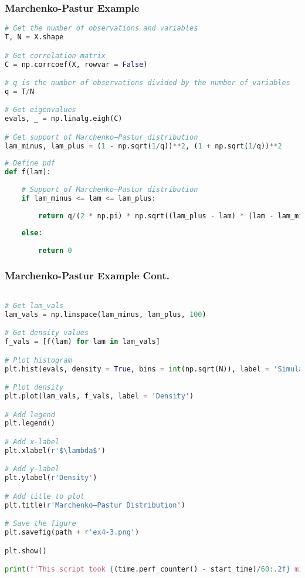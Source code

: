 \documentclass{beamer}
\begin{document}
\begin{frame}[fragile]
\frametitle{Marchenko-Pastur Example}

\begin{lstlisting}[language=Python]
# Get the number of observations and variables
T, N = X.shape

# Get correlation matrix
C = np.corrcoef(X, rowvar = False)

# q is the number of observations divided by the number of variables
q = T/N

# Get eigenvalues
evals, _ = np.linalg.eigh(C)

# Get support of Marchenko–Pastur distribution
lam_minus, lam_plus = (1 - np.sqrt(1/q))**2, (1 + np.sqrt(1/q))**2 
        
# Define pdf
def f(lam):
    
    # Support of Marchenko–Pastur distribution
    if lam_minus <= lam <= lam_plus:
    
        return q/(2 * np.pi) * np.sqrt((lam_plus - lam) * (lam - lam_minus))/lam
                
    else:
        
        return 0

\end{lstlisting}
\end{frame}



\begin{frame}[fragile]
\frametitle{Marchenko-Pastur Example Cont.}

\begin{lstlisting}[language=Python]

# Get lam_vals
lam_vals = np.linspace(lam_minus, lam_plus, 100)

# Get density values
f_vals = [f(lam) for lam in lam_vals]

# Plot histogram
plt.hist(evals, density = True, bins = int(np.sqrt(N)), label = 'Simulated Distribution')

# Plot density
plt.plot(lam_vals, f_vals, label = 'Density')

# Add legend
plt.legend()

# Add x-label
plt.xlabel(r'$\lambda$')

# Add y-label
plt.ylabel(r'Density')

# Add title to plot
plt.title(r'Marchenko–Pastur Distribution')

# Save the figure
plt.savefig(path + r'ex4-3.png')

plt.show()

print(f'This script took {(time.perf_counter() - start_time)/60:.2f} minutes to run.')
\end{lstlisting}

\end{frame}
\end{document}
